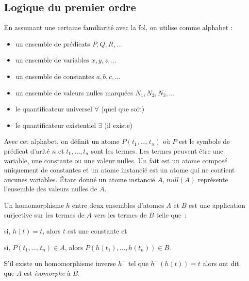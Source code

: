 \subsection{Logique du premier ordre}
\label{sec:update:pre:logic}

En assumant une certaine familiarité avec la \gls{fol}, on utilise comme alphabet :
\begin{itemize}
    \item un ensemble de prédicats $P, Q, R, \dots$
    \item un ensemble de variables $x, y, z, \dots$
    \item un ensemble de constantes $a, b, c, \dots$
    \item un ensemble de valeurs nulles marquées $N_1, N_2, N_3, \dots$
    \item le quantificateur universel $\forall$ (quel que soit)
    \item le quantificateur existentiel $\exists$ (il existe)
\end{itemize}
Avec cet alphabet, on définit un atome $P(t_1, \dots, t_n)$ où $P$ est le symbole de prédicat d'arité $n$ et $t_1, \dots, t_n$ sont les termes.
Les termes peuvent être une variable, une constante ou une valeur nulles.
Un fait est un atome composé uniquement de constantes et un atome instancié est un atome qui ne contient aucunes variables.
Étant donné un atome instancié $A$, $null(A)$ représente l'ensemble des valeurs nulles de $A$.

Un homomorphisme $h$ entre deux ensembles d'atomes $A$ et $B$ est une application surjective sur les termes de $A$ vers les termes de $B$ telle que :
\begin{enumerate*}[label=(\roman*)]
    \item si, $h(t) = t$, alors $t$ est une constante et
    \item si, $P(t_1, \dots, t_n) \in A$, alors $P(h(t_1), \dots, h(t_n)) \in B$.
\end{enumerate*}
S'il existe un homomorphisme inverse $h^-$ tel que $h^-(h(t)) = t$ alors ont dit que $A$ est \textit{isomorphe} à $B$.

